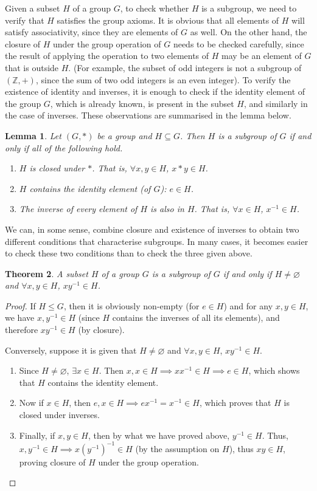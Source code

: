 \documentclass[svgnames]{article}
\newtheorem{Theorem}{Theorem}[section]
\newtheorem{Lemma}[Theorem]{Lemma}
\theoremstyle{definition}
\theoremstyle{remark}
\begin{document}
Given a subset $H$ of a group $G$, to check whether $H$ is a subgroup, we need to verify that $H$ satisfies the group axioms. It is obvious that all elements of $H$ will satisfy associativity, since they are elements of $G$ as well. On the other hand, the closure of $H$ under the group operation of $G$ needs to be checked carefully, since the result of applying the operation to two elements of $H$ may be an element of $G$ that is outside $H$. (For example, the subset of odd integers is not a subgroup of $(\mathbb Z, +)$, since the sum of two odd integers is an even integer). To verify the existence of identity and inverses, it is enough to check if the identity element of the group $G$, which is already known, is present in the subset $H$, and similarly in the case of inverses. These observations are summarised in the lemma below.
\begin{Lemma}\label{lem:Subgroups}
Let $(G, *)$ be a group and $H \subseteq G$. Then $H$ is a subgroup of $G$ if and only if all of the following hold.
\begin{enumerate}
\item $H$ is closed under $*$. That is, $\forall x, y \in H$, $x*y \in H$.
\item $H$ contains the identity element (of $G$): $e \in H$.
\item The inverse of every element of $H$ is also in $H$. That is, $\forall x \in H$, $x^{-1} \in H$.
\end{enumerate}
\end{Lemma}

We can, in some sense, combine closure and existence of inverses to obtain two different conditions that characterise subgroups. In many cases, it becomes easier to check these two conditions than to check the three given above.
\begin{Theorem}\label{thm:Subgroups}
A subset $H$ of a group $G$ is a subgroup of $G$ if and only if $H \ne \varnothing$ and $\forall x, y \in H$, $xy^{-1} \in H$.
\end{Theorem}
\begin{proof}
If $H \le G$, then it is obviously non-empty (for $e \in H$) and for any $x, y \in H$, we have $x, y^{-1} \in H$ (since $H$ contains the inverses of all its elements), and therefore $xy^{-1} \in H$ (by closure).

Conversely, suppose it is given that $H \ne \varnothing$ and $\forall x, y \in H$, $xy^{-1} \in H$.
\begin{enumerate}[label=(\roman*)]
\item Since $H \ne \varnothing$, $\exists x \in H$. Then $x, x \in H \implies xx^{-1} \in H \implies e \in H$, which shows that $H$ contains the identity element.
\item Now if $x \in H$, then $e, x \in H \implies ex^{-1} = x^{-1} \in H$, which proves that $H$ is closed under inverses.
\item Finally, if $x, y \in H$, then by what we have proved above, $y^{-1} \in H$. Thus, $x, y^{-1} \in H \implies x(y^{-1})^{-1} \in H$ (by the assumption on $H$), thus $xy \in H$, proving closure of $H$ under the group operation.
\end{enumerate}
\end{proof}
\end{document}
